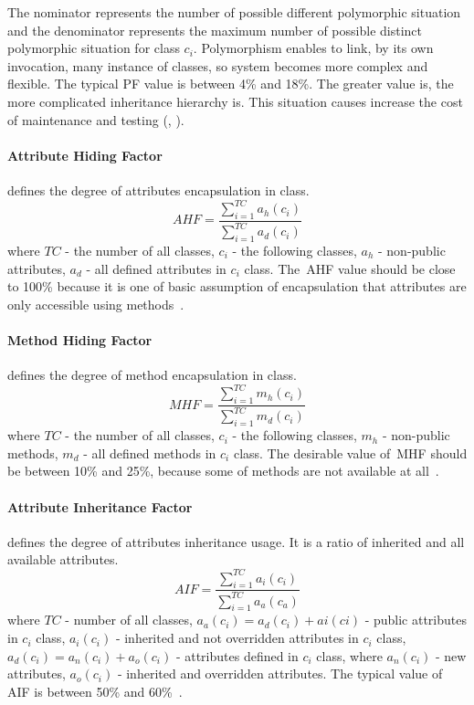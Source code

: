 The nominator represents the number of possible different polymorphic situation
and the denominator represents the maximum number of possible distinct polymorphic
situation for class $c_{i}$. Polymorphism enables to link, by its own invocation, many instance of classes, so system becomes more complex and flexible. The typical \ac{PF} value is between 4\% and 18\%. The greater value is, the more complicated inheritance hierarchy is. This situation causes increase the cost of maintenance and testing (\cite{moodbook}, \cite{nasa}). 

\paragraph{Attribute Hiding Factor} defines the degree of attributes encapsulation in class.
\begin{equation}
AHF=\frac { \sum _{ i=1 }^{ TC }{ { a }_{ h }({ c }_{ i }) }  }{ \sum _{ i=1 }^{ TC }{ { a }_{ d }({ c }_{ i }) }  }
\end{equation}
where $TC$ - the number of all classes, $c_{i}$ - the following classes, $a_{h}$ - non-public attributes, $a_{d}$ - all defined attributes in $c_{i}$ class. The~\ac{AHF} value should be close to 100\% because it is one of basic assumption of encapsulation that attributes are only accessible using methods~\cite{moodbook, nasa}.

\paragraph{Method Hiding Factor} defines the degree of method encapsulation in class.
\begin{equation}
MHF=\frac { \sum _{ i=1 }^{ TC }{ { m }_{ h }({ c }_{ i }) }  }{ \sum _{ i=1 }^{ TC }{ { m }_{ d }({ c }_{ i }) }  } 
\end{equation}
where $TC$ - the number of all classes, $c_{i}$ - the following classes, $m_{h}$ - non-public methods, $m_{d}$ - all defined methods in $c_{i}$ class. The desirable value of~\ac{MHF} should be between 10\% and 25\%, because some of methods are not available at all~\cite{moodbook, nasa}.


\paragraph{Attribute Inheritance Factor} defines the degree of attributes inheritance usage. It is a ratio of inherited and all available attributes. 
\begin{equation}
AIF=\frac { \sum _{ i=1 }^{ TC }{ { a }_{ i }({ c }_{ i }) }  }{ \sum _{ i=1 }^{ TC }{ { a }_{ a }({ c }_{ a }) }  } 
\end{equation}
where $TC$ - number of all classes, $a_{a}(c_{i}) = a_{d}(c_{i}) + a{i}(c{i})$ - public attributes in $c_{i}$ class, $a_{i}(c_{i})$ - inherited and not overridden attributes in $c_{i}$ class, $a_{d}(c_{i}) = a_{n}(c_{i}) + a_{o}(c_{i})$ - attributes defined in $c_{i}$ class, where $a_{n}(c_{i})$ - new attributes, $a_{o}(c_{i})$  - inherited and overridden attributes. The typical value of \ac{AIF} is between 50\% and 60\%~\cite{moodbook, nasa}.  


